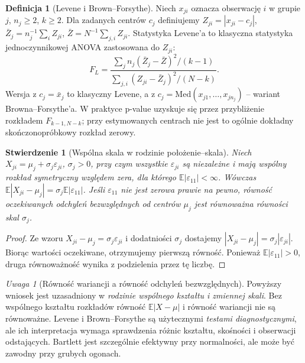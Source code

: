 \documentclass[11pt,a4paper,oneside]{report}
\numberwithin{equation}{chapter}
\theoremstyle{plain}
\newtheorem{stwierdzenie}[twierdzenie]{Stwierdzenie}
\theoremstyle{definition}
\newtheorem{definicja}{Definicja}[chapter]
\theoremstyle{remark}
\newtheorem{uwaga}{Uwaga}[chapter]
\newcommand{\E}{\mathbb E}
\begin{document}
\begin{definicja}[Levene i Brown--Forsythe]\label{def:levene}
Niech $x_{ji}$ oznacza obserwację $i$ w grupie $j$, $n_j\ge2$, $k\ge2$. Dla zadanych centrów $c_j$ definiujemy $Z_{ji}=|x_{ji}-c_j|$, $\bar Z_j=n_j^{-1}\sum_i Z_{ji}$, $\bar Z=N^{-1}\sum_{j,i} Z_{ji}$. Statystyka Levene'a to klasyczna statystyka jednoczynnikowej ANOVA zastosowana do $Z_{ji}$:
\[
 F_L=\frac{\sum_j n_j(\bar Z_j-\bar Z)^2/(k-1)}{\sum_{j,i}(Z_{ji}-\bar Z_j)^2/(N-k)}.
\]
Wersja z $c_j=\bar x_j$ to klasyczny Levene, a z $c_j=\mathrm{Med}(x_{j1},\ldots,x_{jn_j})$ -- wariant Browna--Forsythe'a. W praktyce p-value uzyskuje się przez przybliżenie rozkładem $F_{k-1,N-k}$; przy estymowanych centrach nie jest to ogólnie dokładny skończonopróbkowy rozkład zerowy.
\end{definicja}

\begin{stwierdzenie}[Wspólna skala w rodzinie położenie--skala]\label{prop:levene-scale}
Niech $X_{ji}=\mu_j+\sigma_j\varepsilon_{ji}$, $\sigma_j>0$, przy czym wszystkie $\varepsilon_{ji}$ są niezależne i mają wspólny rozkład symetryczny względem zera, dla którego $\E|\varepsilon_{11}|<\infty$. Wówczas $\E|X_{ji}-\mu_j|=\sigma_j\E|\varepsilon_{11}|$. Jeśli $\varepsilon_{11}$ nie jest zerowa prawie na pewno, równość oczekiwanych odchyleń bezwzględnych od centrów $\mu_j$ jest równoważna równości skal $\sigma_j$.
\end{stwierdzenie}
\begin{proof}
Ze wzoru $X_{ji}-\mu_j=\sigma_j\varepsilon_{ji}$ i dodatniości $\sigma_j$ dostajemy $|X_{ji}-\mu_j|=\sigma_j|\varepsilon_{ji}|$. Biorąc wartości oczekiwane, otrzymujemy pierwszą równość. Ponieważ $\E|\varepsilon_{11}|>0$, druga równoważność wynika z podzielenia przez tę liczbę.
\end{proof}

\begin{uwaga}[Równość wariancji a równość odchyleń bezwzględnych]
Powyższy wniosek jest uzasadniony w \emph{rodzinie wspólnego kształtu i zmiennej skali}. Bez wspólnego kształtu rozkładów równość $\E|X-\mu|$ i równość wariancji nie są równoważne. Levene i Brown--Forsythe są użytecznymi \emph{testami diagnostycznymi}, ale ich interpretacja wymaga sprawdzenia różnic kształtu, skośności i obserwacji odstających. Bartlett jest szczególnie efektywny przy normalności, ale może być zawodny przy grubych ogonach.
\end{uwaga}
\end{document}
